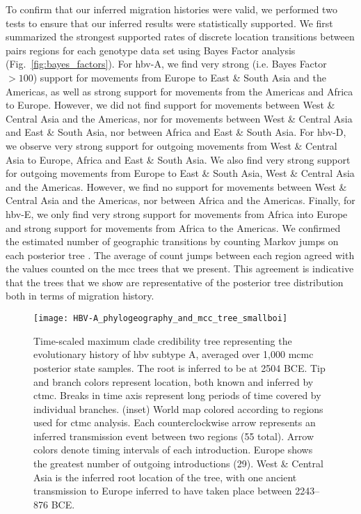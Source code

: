 To confirm that our inferred migration histories were valid, we performed two tests to ensure that our inferred results were statistically supported.
We first summarized the strongest supported rates of discrete location transitions between pairs regions for each genotype data set using Bayes Factor analysis (Fig.~\ref{fig:bayes_factors}).
For \gls{hbv}-A, we find very strong (i.e. Bayes Factor $>100$) support for movements from Europe to East \& South Asia and the Americas, as well as strong support for movements from the Americas and Africa to Europe.
However, we did not find support for movements between West \& Central Asia and the Americas, nor for movements between West \& Central Asia and East \& South Asia, nor between Africa and East \& South Asia.
For \gls{hbv}-D, we observe very strong support for outgoing movements from West \& Central Asia to Europe, Africa and East \& South Asia.
We also find very strong support for outgoing movements from Europe to East \& South Asia, West \& Central Asia and the Americas.
However, we find no support for movements between West \& Central Asia and the Americas, nor between Africa and the Americas.
Finally, for \gls{hbv}-E, we only find very strong support for movements from Africa into Europe and strong support for movements from Africa to the Americas.
We confirmed the estimated number of geographic transitions by counting Markov jumps on each posterior tree .
The average of count jumps between each region agreed with the values counted on the \gls{mcc} trees that we present.
This agreement is indicative that the trees that we show are representative of the posterior tree distribution both in terms of migration history.

\barneycomment{\ref{fig:bayes_factors}}

\begin{figure}[ht]
  \centering
  \medskip
  \texttt{[image: HBV-A\_phylogeography\_and\_mcc\_tree\_smallboi]}
  \caption[HBV-A phylogeography ]{Time-scaled maximum clade credibility tree representing the evolutionary history of \gls{hbv} subtype A, averaged over 1,000 \gls{mcmc} posterior state samples. The root is inferred to be at 2504 BCE. Tip and branch colors represent location, both known and inferred by \gls{ctmc}. Breaks in time axis represent long periods of time covered by individual branches. (inset) World map colored according to regions used for \gls{ctmc} analysis. Each counterclockwise arrow represents an inferred transmission event between two regions (55 total). Arrow colors denote timing intervals of each introduction. Europe shows the greatest number of outgoing introductions (29). West \& Central Asia is the inferred root location of the tree, with one ancient transmission to Europe inferred to have taken place between 2243--876 BCE.}
  \label{fig:HBV-A_phylogeo}
\end{figure}

